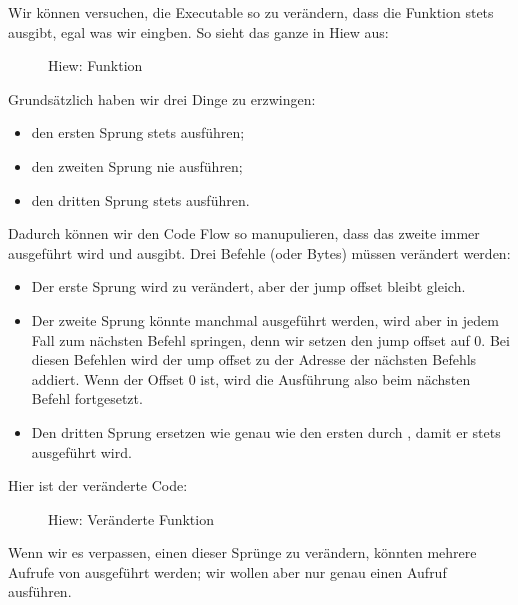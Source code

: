 



\clearpage
{}
Wir können versuchen, die Executable so zu verändern, dass die Funktion  stets  ausgibt, egal
was wir eingben.
So sieht das ganze in Hiew aus:
\begin{figure}[H]
\centering
{}
\caption{Hiew: Funktion }
\label{fig:jcc_hiew_1}
\end{figure}
Grundsätzlich haben wir drei Dinge zu erzwingen:
\begin{itemize}
  \item den ersten Sprung stets ausführen;
  \item den zweiten Sprung nie ausführen;
  \item den dritten Sprung stets ausführen.
\end{itemize}

Dadurch können wir den Code Flow so manupulieren, dass das zweite \printf immer ausgeführt wird und  ausgibt.
Drei Befehle (oder Bytes) müssen verändert werden:
\begin{itemize}
\item Der erste Sprung wird zu \JMP verändert, aber der \gls{jump offset} bleibt gleich.

 
\item Der zweite Sprung könnte manchmal ausgeführt werden, wird aber in jedem Fall zum nächsten Befehl springen, denn
wir setzen den \gls{jump offset} auf 0.
Bei diesen Befehlen wird der \gls{ump offset} zu der Adresse der nächsten Befehls addiert. Wenn der Offset 0 ist, wird
die Ausführung also beim nächsten Befehl fortgesetzt.
\item 
Den dritten Sprung ersetzen wie genau wie den ersten durch \JMP, damit er stets ausgeführt wird.

\end{itemize}

\clearpage
Hier ist der veränderte Code:

\begin{figure}[H]
\centering
{}
\caption{Hiew: Veränderte Funktion }
\label{fig:jcc_hiew_2}
\end{figure}
Wenn wir es verpassen, einen dieser Sprünge zu verändern, könnten mehrere Aufrufe von \printf ausgeführt werden; wir
wollen aber nur genau einen Aufruf ausführen.

